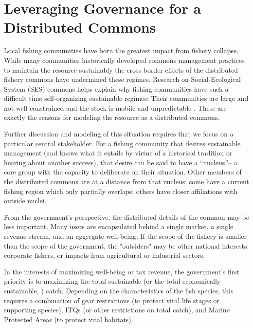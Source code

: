 \documentclass[12pt, oneside]{amsart}
\begin{document}
\section*{Leveraging Governance for a Distributed Commons}


Local fishing communities have born the greatest impact from fishery collapse.  While many communities historically developed commons management practices to maintain the resource sustainably the cross-border effects of the distributed fishery commons have undermined these regimes.  Research on Social-Ecological System (SES) commons helps explain why fishing communities have such a difficult time self-organizing sustainable regimes: Their communities are large and not well constrained and the stock is mobile and unpredictable \citep{ostrom2009general}.  These are exactly the reasons for modeling the resource as a distributed commons.

Further discussion and modeling of this situation requires that we focus on a particular central stakeholder.  For a fishing community that desires sustainable management (and knows what it entails by virtue of a historical tradition or hearing about another success), that desire can be said to have a ``nucleus''-- a core group with the capacity to deliberate on their situation.  Other members of the distributed commons are at a distance from that nucleus: some have a current fishing region which only partially overlaps; others have closer affiliations with outside nuclei.


From the government's perspective, the distributed details of the common may be less important.  Many users are encapsulated behind a single market, a single revenue stream, and an aggregate well-being. If the scope of the fishery is smaller than the scope of the government, the "outsiders" may be other national interests: corporate fishers, or impacts from agricultural or industrial sectors.

In the interests of maximizing well-being or tax revenue, the government's first priority is to maximizing the total sustainable (or the total economically sustainable, \citep{roughgarden1996fisheries}) catch.  Depending on the characteristics of the fish species, this requires a combination of gear restrictions (to protect vital life stages or supporting species), ITQs (or other restrictions on total catch), and Marine Protected Areas (to protect vital habitats).
\end{document}
